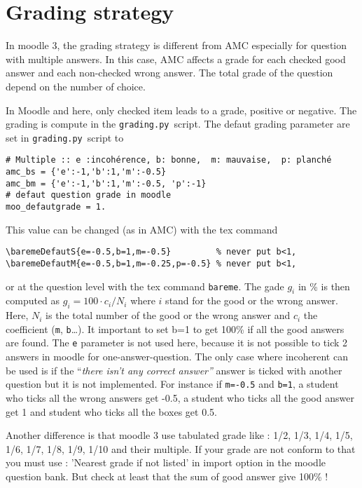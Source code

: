 \documentclass[a4paper]{article}
\newcommand{\py}{\texttt{grading.py}~}
\begin{document}
\section{Grading strategy}
In moodle 3, %
the grading strategy is different from AMC especially for question with multiple answers. In this case, AMC affects a grade for each checked good answer and each non-checked wrong answer. The total grade of the question depend on the number of choice.

In Moodle and here, only checked item leads to a grade, positive or negative. The grading is compute in the \py script.
The defaut grading parameter are set in \py script to
\begin{verbatim}
# Multiple :: e :incohérence, b: bonne,  m: mauvaise,  p: planché
amc_bs = {'e':-1,'b':1,'m':-0.5}              
amc_bm = {'e':-1,'b':1,'m':-0.5, 'p':-1}   
# defaut question grade in moodle
moo_defautgrade = 1.                       
\end{verbatim}
This value can be changed (as in AMC) with the tex command
\begin{verbatim}
\baremeDefautS{e=-0.5,b=1,m=-0.5}         % never put b<1,
\baremeDefautM{e=-0.5,b=1,m=-0.25,p=-0.5} % never put b<1,
\end{verbatim}
or at the question level with the tex command \texttt{bareme}.
The gade $g_i$ in \% is then computed as
$g_i = 100\cdot c_i / N_i$ where $i$ stand for the good or the wrong answer. Here, $N_i$ is the total number of the good or the wrong answer and $c_i$ the coefficient (\texttt{m}, \texttt{b}\dots). It important to set b=1 to get 100\% if all the good answers are found. The \texttt{e} parameter is not used here, because it is not possible to tick 2 answers in moodle for one-answer-question. The only case where incoherent can be used is if the ``\emph{there isn't any correct answer''} answer is ticked with another question but it is not implemented.
For instance if \texttt{m=-0.5} and \texttt{b=1}, a student who ticks all the wrong answers get -0.5, a student who ticks all the good answer get  1 and student who ticks all the boxes get 0.5.

Another difference is that moodle 3 use tabulated grade like : 1/2, 1/3, 1/4, 1/5, 1/6, 1/7, 1/8, 1/9, 1/10 and their multiple. If your grade are not conform to that you must use : 'Nearest grade if not listed' in import option in the moodle question bank. But check at least that the sum of good answer give 100\% !
\end{document}
